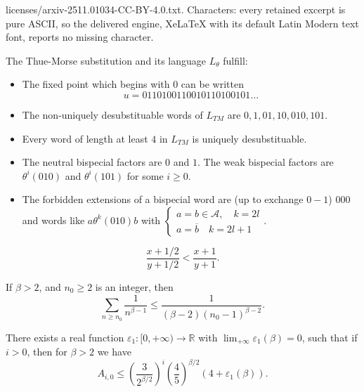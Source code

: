 \documentclass[10pt,a4paper]{amsart}
\def\R{{\mathbb R}}
\def\be{\beta}
\begin{document}
licenses/arxiv-2511.01034-CC-BY-4.0.txt. Characters: every retained excerpt is pure ASCII, so the delivered engine, XeLaTeX with its default Latin Modern text font, reports no missing character.
 \begin{lemma}\label{lem-cass}
The Thue-Morse substitution and its language $L_{\theta}$ fulfill:
\begin{itemize}
\item The fixed point which begins with $0$ can be written $$u=0110100110010110100101\dots$$

\item The non-uniquely desubstituable words of $L_{TM}$ are $0,1,01,10,010,101$.
\item Every word of length at least $4$ in $L_{TM}$ is uniquely desubstituable.
\item The neutral bispecial factors are $0$ and $1$. The weak bispecial factors are $\theta^i(010)$ and $\theta^i(101)$ for some $i\geq 0$.
\item The forbidden extensions of a bispecial word are (up to exchange $0-1$) $000$ and words like $a\theta^k(010)b$ with $\begin{cases}a=b\in \mathcal{A}, \quad k=2l\\ a=\overline{b}\quad k=2l+1\end{cases}$.


\end{itemize}
\end{lemma}

\begin{equation}\label{inegalite}
\frac{x+1/2}{y+1/2}<\frac{x+1}{y+1}.
\end{equation} 

\begin{lemma}\label{lem-integrale}
If $\be>2$, and $n_0\geq 2$ is an integer, then 
$$\sum_{n\geq n_0} \frac{1}{n^{\beta-1}}\leq \frac{1}{(\beta-2)(n_0-1)^{\beta-2}}.$$
\end{lemma}

\begin{lemma}\label{lem-calcul1}
There exists a real function $\varepsilon_1:[0,+\infty)\rightarrow \R$  with $\lim_{+\infty} \varepsilon_1(\beta)=0$, such that if $i>0$, then for $\beta>2$ we have 
$$A_{i,0}\leq (\frac{3}{2^{\beta/2}})^{i}(\frac{4}{5})^{\beta/2}(4+\varepsilon_1(\beta)).$$

\end{lemma}
\end{document}
